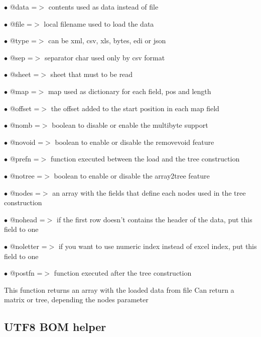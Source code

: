 \documentclass[a4paper]{book}
\begin{document}
\begin{compactitem}
\item[\color{myblue}$\bullet$] @data     =$>$ contents used as data instead of file
\item[\color{myblue}$\bullet$] @file     =$>$ local filename used to load the data
\item[\color{myblue}$\bullet$] @type     =$>$ can be xml, csv, xls, bytes, edi or json
\item[\color{myblue}$\bullet$] @sep      =$>$ separator char used only by csv format
\item[\color{myblue}$\bullet$] @sheet    =$>$ sheet that must to be read
\item[\color{myblue}$\bullet$] @map      =$>$ map used as dictionary for each field, pos and length
\item[\color{myblue}$\bullet$] @offset   =$>$ the offset added to the start position in each map field
\item[\color{myblue}$\bullet$] @nomb     =$>$ boolean to disable or enable the multibyte support
\item[\color{myblue}$\bullet$] @novoid   =$>$ boolean to enable or disable the removevoid feature
\item[\color{myblue}$\bullet$] @prefn    =$>$ function executed between the load and the tree construction
\item[\color{myblue}$\bullet$] @notree   =$>$ boolean to enable or disable the array2tree feature
\item[\color{myblue}$\bullet$] @nodes    =$>$ an array with the fields that define each nodes used in the tree construction
\item[\color{myblue}$\bullet$] @nohead   =$>$ if the first row doesn't contains the header of the data, put this field to one
\item[\color{myblue}$\bullet$] @noletter =$>$ if you want to use numeric index instead of excel index, put this field to one
\item[\color{myblue}$\bullet$] @postfn   =$>$ function executed after the tree construction
\end{compactitem}

This function returns an array with the loaded data from file
Can return a matrix or tree, depending the nodes parameter

\hypertarget{toc153}{}
\subsection{UTF8 BOM helper}
\end{document}

